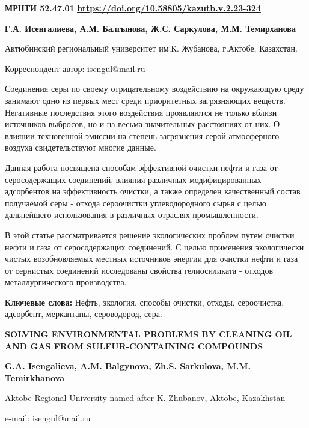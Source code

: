 \newpage
{\bfseries МРНТИ 52.47.01}
\hfill {\bfseries \href{https://doi.org/10.58805/kazutb.v.2.23-324}{https://doi.org/10.58805/kazutb.v.2.23-324}}


\begin{center}
{\bfseries Г.А. Исенгалиева\envelope, А.М. Балгынова, Ж.С. Саркулова, М.М. Темирханова}

Актюбинский региональный университет им.К. Жубанова, г.Актобе,
Казахстан.

\envelope Корреспондент-автор: isengul@mail.ru
\end{center}

Соединения серы по своему отрицательному воздействию на окружающую среду
занимают одно из первых мест среди приоритетных загрязняющих веществ.
Негативные последствия этого воздействия проявляются не только вблизи
источников выбросов, но и на весьма значительных расстояниях от них. О
влиянии техногенной эмиссии на степень загрязнения серой атмосферного
воздуха свидетельствуют многие данные.

Данная работа посвящена способам эффективной очистки нефти и газа от
серосодержащих соединений, влияния различных модифицированных
адсорбентов на эффективность очистки, а также определен качественный
состав получаемой серы - отхода сероочистки углеводородного сырья с
целью дальнейшего использования в различных отраслях промышленности.

В этой статье рассматривается решение экологических проблем путем
очистки нефти и газа от серосодержащих соединений. С целью применения
экологически чистых возобновляемых местных источников энергии для
очистки нефти и газа от сернистых соединений исследованы свойства
гелиосиликата - отходов металлургического производства.

{\bfseries Ключевые слова:} Нефть, экология, способы очистки, отходы,
сероочистка, адсорбент, меркаптаны, сероводород, сера.

\begin{center}
{\large\bfseries SOLVING ENVIRONMENTAL PROBLEMS BY CLEANING OIL AND GAS FROM SULFUR-CONTAINING COMPOUNDS}

{\bfseries G.A. Isengalieva\envelope, A.M. Balgynova, Zh.S. Sarkulova, M.M. Temirkhanova}

Aktobe Regional University named after K. Zhubanov, Aktobe, Kazakhstan

e-mail: isengul@mail.ru
\end{center}

